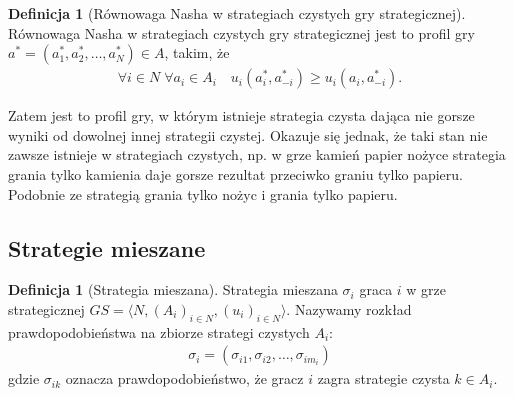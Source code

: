\documentclass[inzynierska]{pwr_wmat_praca_dyplomowa}
\theoremstyle{plain}
\numberwithin{theorem}{chapter}
\theoremstyle{definition}
\numberwithin{theorem}{chapter}
\newtheorem{definition}[theorem]{Definicja}
\begin{document}
	\begin{definition}[Równowaga Nasha w strategiach czystych gry strategicznej]
		Równowaga Nasha w strategiach czystych gry strategicznej jest to profil gry $a^*= (a_1^*,a_2^*,\dots,a_N^*)\in A$, takim, że
		\begin{align*}
			\mathop{\forall}{i \in N}\;
			\mathop{\forall}{a_i \in A_i} \quad
			u_i(a_i^*,a_{-i}^*) \ge u_i(a_i, a_{-i}^*).
		\end{align*}
	\end{definition}
	Zatem jest to profil gry, w którym istnieje strategia czysta dająca nie gorsze wyniki od dowolnej innej strategii czystej.
	Okazuje się jednak, że taki stan nie zawsze istnieje w strategiach czystych, np. w grze kamień papier nożyce strategia grania tylko kamienia daje gorsze rezultat przeciwko graniu tylko papieru. Podobnie ze strategią grania tylko nożyc i grania tylko papieru.
	\subsection{Strategie mieszane}
	\begin{definition}[Strategia mieszana]
		Strategia mieszana $\sigma_i$ graca $i$ w grze strategicznej $GS = \langle N, (A_i)_{i \in N},(u_i)_{i \in N} \rangle $. Nazywamy rozkład prawdopodobieństwa na zbiorze strategi czystych $A_i$:
		\begin{align*}
			\sigma_i = (\sigma_{i1}, \sigma_{i2},\dots,\sigma_{im_i})
		\end{align*}
	gdzie $\sigma_{ik}$ oznacza prawdopodobieństwo, że gracz $i$ zagra strategie czysta $k\in A_i$.  
	\end{definition}
\end{document}
